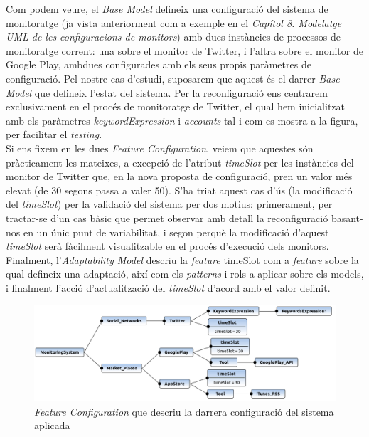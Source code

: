 Com podem veure, el \textit{Base Model} defineix una configuració del sistema de monitoratge (ja vista anteriorment com a exemple en el \textit{Capítol 8. Modelatge UML de les configuracions de monitors}) amb dues instàncies de processos de monitoratge corrent: una sobre el monitor de Twitter, i l'altra sobre el monitor de Google Play, ambdues configurades amb els seus propis paràmetres de configuració. Pel nostre cas d'estudi, suposarem que aquest és el darrer \textit{Base Model} que defineix l'estat del sistema. Per la reconfiguració ens centrarem exclusivament en el procés de monitoratge de Twitter, el qual hem inicialitzat amb els paràmetres \textit{keywordExpression} i \textit{accounts} tal i com es mostra a la figura, per facilitar el \textit{testing}.\\

Si ens fixem en les dues \textit{Feature Configuration}, veiem que aquestes són pràcticament les mateixes, a excepció de l'atribut \textit{timeSlot} per les instàncies del monitor de Twitter que, en la nova proposta de configuració, pren un valor més elevat (de 30 segons passa a valer 50). S'ha triat aquest cas d'ús (la modificació del \textit{timeSlot}) per la validació del sistema per dos motius: primerament, per tractar-se d'un cas bàsic que permet observar amb detall la reconfiguració basant-nos en un únic punt de variabilitat, i segon perquè la modificació d'aquest \textit{timeSlot} serà fàcilment visualitzable en el procés d'execució dels monitors.\\ 

Finalment, l'\textit{Adaptability Model} descriu la \textit{feature} timeSlot com a \textit{feature} sobre la qual defineix una adaptació, així com els \textit{patterns} i rols a aplicar sobre els models, i finalment l'acció d'actualització del \textit{timeSlot} d'acord amb el valor definit.\\

\begin{figure}
\centering
\includegraphics[width=14cm]{Figures/Figure36}
\decoRule
\caption{\textit{Feature Configuration} que descriu la darrera configuració del sistema aplicada}
\label{fig:Figura37}
\end{figure} 

